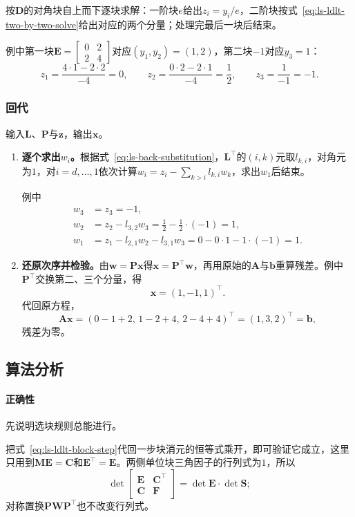 按$\bm D$的对角块自上而下逐块求解：一阶块$e$给出$z_i=y_i/e$，二阶块按式~\eqref{eq:ls-ldlt-two-by-two-solve}给出对应的两个分量；处理完最后一块后结束。

例中第一块$\bm E=\left[\begin{smallmatrix}0&2\\2&4\end{smallmatrix}\right]$对应$(y_1,y_2)=(1,2)$，第二块$-1$对应$y_3=1$：
\[
 z_1=\frac{4\cdot1-2\cdot2}{-4}=0,\qquad
 z_2=\frac{0\cdot2-2\cdot1}{-4}=\frac12,\qquad
 z_3=\frac{1}{-1}=-1 .
\]

\subsubsection{回代}
输入$\bm L$、$\bm P$与$\bm z$，输出$\bm x$。
\begin{enumerate}
 \item \textbf{逐个求出$w_i$。}根据式~\eqref{eq:ls-back-substitution}，$\bm L^\top$的$(i,k)$元取$l_{k,i}$，对角元为$1$，对$i=d,\ldots,1$依次计算$w_i=z_i-\sum_{k>i}l_{k,i}w_k$，求出$w_1$后结束。
 
 例中
 \[
  \begin{aligned}
  w_3&=z_3=-1,\\
  w_2&=z_2-l_{3,2}w_3=\tfrac12-\tfrac12\cdot(-1)=1,\\
  w_1&=z_1-l_{2,1}w_2-l_{3,1}w_3=0-0\cdot1-1\cdot(-1)=1 .
  \end{aligned}
 \]

 \item \textbf{还原次序并检验。}由$\bm w=\bm P\bm x$得$\bm x=\bm P^\top\bm w$，再用原始的$\bm A$与$\bm b$重算残差。例中$\bm P^\top$交换第二、三个分量，得
 \[
  \bm x=(1,-1,1)^\top .
 \]
 代回原方程，
 \[
  \bm A\bm x=(0-1+2,\,1-2+4,\,2-4+4)^\top=(1,3,2)^\top=\bm b ,
 \]
 残差为零。
\end{enumerate}

\subsection{算法分析}
\paragraph{正确性}
先说明选块规则总能进行。

把式~\eqref{eq:ls-ldlt-block-step}代回一步块消元的恒等式乘开，即可验证它成立，这里只用到$\bm M\bm E=\bm C$和$\bm E^\top=\bm E$。两侧单位块三角因子的行列式为$1$，所以
\[
 \det\begin{bmatrix}\bm E&\bm C^\top\\\bm C&\bm F\end{bmatrix}=\det\bm E\cdot\det\bm S ;
\]
对称置换$\bm P\bm W\bm P^\top$也不改变行列式。


